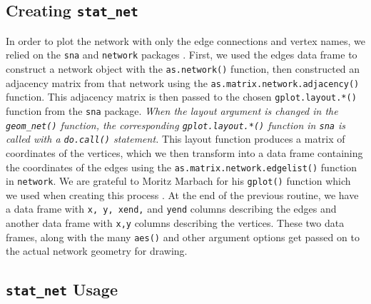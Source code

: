 \documentclass[11pt]{article}\usepackage[]{graphicx}\usepackage[]{color}
\begin{document}
  \subsection{Creating \texttt{stat\_net}}
  In order to plot the network with only the edge connections and vertex names, we relied on the \texttt{sna} and \texttt{network} packages \citep{sna, network.jss}. First, we used the edges data frame to construct a network object with the \texttt{as.network()} function, then constructed an adjacency matrix from that network using the \texttt{as.matrix.network.adjacency()} function.  This adjacency matrix is then passed to the chosen \texttt{gplot.layout.*()} function from the \texttt{sna} package.  \emph{When the layout argument is changed in the \texttt{geom\_net()} function, the corresponding \texttt{gplot.layout.*()} function in \texttt{sna} is called with a \texttt{do.call()} statement.} This layout function produces a matrix of coordinates of the vertices, which we then transform into a data frame containing the coordinates of the edges using the \texttt{as.matrix.network.edgelist()} function in \texttt{network}.  We are grateful to Moritz Marbach for his \texttt{gplot()} function which we used when creating this process \citep{marbach}.  At the end of the previous routine, we have a data frame with \texttt{x, y, xend,} and \texttt{yend} columns describing the edges and another data frame with \texttt{x,y} columns describing the vertices.  These two data frames, along with the many \texttt{aes()} and other argument options get passed on to the actual network geometry for drawing.
   \subsection{\texttt{stat\_net} Usage}
\end{document}
